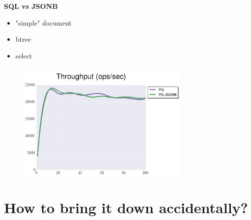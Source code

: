 \documentclass[usenames,dvipsnames, 18pt, compress, aspectratio=169]{beamer}
\begin{document}
\begin{frame}
    \frametitle{}
    \begin{center}
        \textbf{SQL vs JSONB}
        \begin{itemize}[label={}]
            \item "simple" document
            \item btree
            \item select
        \end{itemize}
    \end{center}
\end{frame}

\begin{frame}
    \frametitle{}
    \begin{center}
    \begin{figure}
        \includegraphics[width=0.75\textwidth,center]{benchmarks/postgresql_run_jsonb_jdbc.png}
    \end{figure}
    \end{center}
\end{frame}

\fontsize{13pt}{14}\selectfont
\section{How to bring it down accidentally?}
\fontsize{17pt}{18}\selectfont
\end{document}
